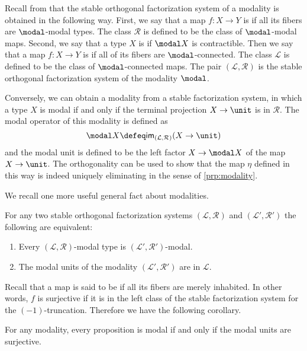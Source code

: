 \documentclass{msc}
\begin{document}
Recall from \cite{RijkeSpittersShulman} that the stable orthogonal factorization system of a modality is obtained in the following way. First, we say that a map $f:X\to Y$ is  if all its fibers are $\modal$-modal types. The class $\mathcal{R}$ is defined to be the class of $\modal$-modal maps. Second, we say that a type $X$ is  if $\modal X$ is contractible. Then we say that a map $f:X\to Y$ is  if all of its fibers are $\modal$-connected. The class $\mathcal{L}$ is defined to be the class of $\modal$-connected maps. The pair $(\mathcal{L},\mathcal{R})$ is the stable orthogonal factorization system of the modality $\modal$.

Conversely, we can obtain a modality from a stable factorization system, in which a type $X$ is modal if and only if the terminal projection $X\to \unit$ is in $\mathcal{R}$. The modal operator of this modality is defined as
\begin{equation*}
\modal X \defeq \mathsf{im}_{(\mathcal{L},\mathcal{R})}(X\to \unit)
\end{equation*}
and the modal unit is defined to be the left factor $X \to \modal X$ of the map $X\to \unit$. The orthogonality can be used to show that the map $\eta$ defined in this way is indeed uniquely eliminating in the sense of \cref{prp:modality}.

We recall one more useful general fact about modalities.

\begin{thm}
  For any two stable orthogonal factorization systems $(\mathcal{L},\mathcal{R})$ and $(\mathcal{L}',\mathcal{R}')$ the following are equivalent:
\begin{enumerate}
\item Every $(\mathcal{L},\mathcal{R})$-modal type is $(\mathcal{L}',\mathcal{R}')$-modal.
\item The modal units of the modality $(\mathcal{L}',\mathcal{R}')$ are in $\mathcal{L}$.
\end{enumerate}
\end{thm}

Recall that a map is said to be  if all its fibers are merely inhabited. In other words, $f$ is surjective if it is in the left class of the stable factorization system for the $(-1)$-truncation. Therefore we have the following corollary.

\begin{cor}\label{cor:units-surjective}
  For any modality, every proposition is modal if and only if the modal units are surjective.
\end{cor}
\end{document}
